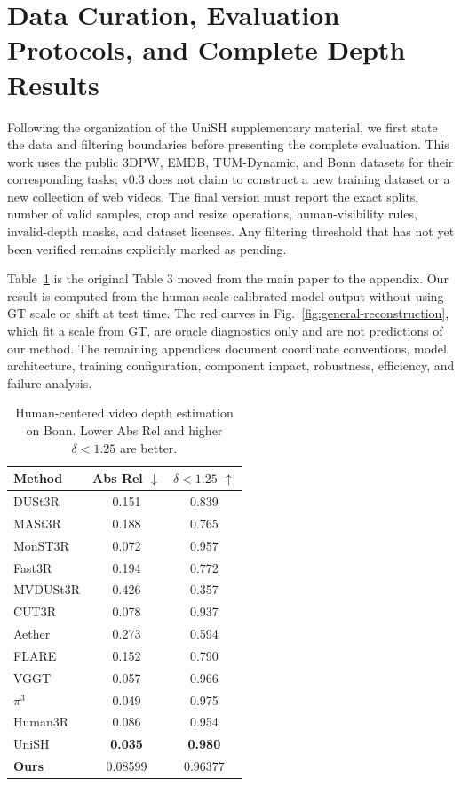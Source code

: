 \section{Data Curation, Evaluation Protocols, and Complete Depth Results}
\label{app:bonn-results}

Following the organization of the UniSH supplementary material, we first state the data and filtering boundaries before presenting the complete evaluation. This work uses the public 3DPW, EMDB, TUM-Dynamic, and Bonn datasets for their corresponding tasks; v0.3 does not claim to construct a new training dataset or a new collection of web videos. The final version must report the exact splits, number of valid samples, crop and resize operations, human-visibility rules, invalid-depth masks, and dataset licenses. Any filtering threshold that has not yet been verified remains explicitly marked as pending.

Table~\ref{tab:bonn-depth} is the original Table 3 moved from the main paper to the appendix. Our result is computed from the human-scale-calibrated model output without using GT scale or shift at test time. The red curves in Fig.~\ref{fig:general-reconstruction}, which fit a scale from GT, are oracle diagnostics only and are not predictions of our method. The remaining appendices document coordinate conventions, model architecture, training configuration, component impact, robustness, efficiency, and failure analysis.

\begin{table}[H]
\caption{Human-centered video depth estimation on Bonn. Lower Abs Rel and higher $\delta<1.25$ are better.}
\label{tab:bonn-depth}
\centering
\begin{tabular}{lcc}
\toprule
Method & Abs Rel $\downarrow$ & $\delta<1.25$ $\uparrow$ \\
\midrule
DUSt3R & 0.151 & 0.839 \\
MASt3R & 0.188 & 0.765 \\
MonST3R & 0.072 & 0.957 \\
Fast3R & 0.194 & 0.772 \\
MVDUSt3R & 0.426 & 0.357 \\
CUT3R & 0.078 & 0.937 \\
Aether & 0.273 & 0.594 \\
FLARE & 0.152 & 0.790 \\
VGGT & 0.057 & 0.966 \\
$\pi^3$ & 0.049 & 0.975 \\
Human3R & 0.086 & 0.954 \\
UniSH & \textbf{0.035} & \textbf{0.980} \\
\textbf{Ours} & 0.08599 & 0.96377 \\
\bottomrule
\end{tabular}
\end{table}

